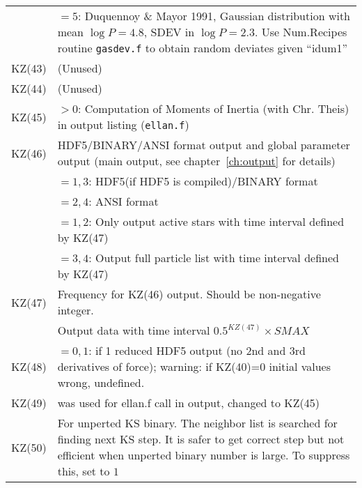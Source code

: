 \begin{longtable}{@{}p{1.5cm}p{13.0cm}}
        & $=5$: Duquennoy \& Mayor 1991, Gaussian distribution with mean $\log{P}=4.8$, SDEV in $\log{P}=2.3$. Use Num.Recipes routine \texttt{gasdev.f} to obtain random deviates given ``idum1'' \\
KZ(43)  & (Unused) \\
KZ(44)  & (Unused) \\
KZ(45)  & $>0$: Computation of Moments of Inertia (with Chr. Theis) in output listing (\texttt{ellan.f}) \\
KZ(46)  &  HDF5/BINARY/ANSI format output and global parameter output (main output, see chapter~\ref{ch:output} for details) \\
        &  $=1,3$: HDF5(if HDF5 is compiled)/BINARY format\\
        &  $=2,4$: ANSI format \\
        &  $=1,2$: Only output active stars with time interval defined by KZ(47) \\
        &  $=3,4$: Output full particle list with time interval defined by KZ(47) \\
KZ(47)  &  Frequency for KZ(46) output. Should be non-negative integer. \\
        &  Output data with time interval $0.5^{KZ(47)} \times SMAX$ \\
KZ(48)  & $=0,1$: if 1 reduced HDF5 output (no 2nd and 3rd derivatives of force); warning: if KZ(40)=0 initial values wrong, undefined. \\
KZ(49)  & was used for ellan.f call in output, changed to KZ(45) \\
KZ(50)  & For unperted KS binary. The neighbor list is searched for finding next KS step. It is safer to get correct step but not efficient when unperted binary number is large. To suppress this, set to $1$ \\

\end{longtable}

